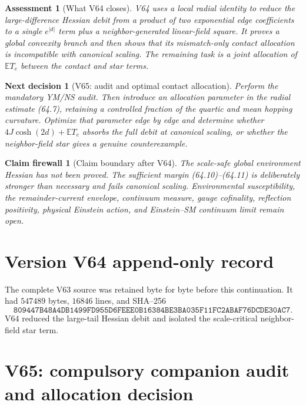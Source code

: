 \documentclass[11pt]{article}
\newtheorem{firewall}[theorem]{Claim firewall}
\newtheorem{decision}[theorem]{Next decision}
\newtheorem{assessment}[theorem]{Assessment}
\theoremstyle{remark}
\begin{document}
\begin{assessment}[What V64 closes]
\label{ass:v17v64-status}
V64 uses a local radial identity to reduce the large-difference
Hessian debit from a product of two exponential edge coefficients to
a single \(e^{|d|}\) term plus a neighbor-generated linear-field
square.  It proves a global convexity branch and then shows that its
mismatch-only contact allocation is incompatible with canonical
scaling.  The remaining task is a joint allocation of
\(\mathbb ET_e\) between the contact and star terms.
\end{assessment}

\begin{decision}[V65: audit and optimal contact allocation]
\label{dec:v17v64-next}
Perform the mandatory YM/NS audit.  Then introduce an allocation
parameter in the radial estimate (64.7), retaining a controlled
fraction of the quartic and mean hopping curvature.  Optimize that
parameter edge by edge and determine whether
\(4J\cosh(2d)+\mathbb ET_e\) absorbs the full debit at canonical
scaling, or whether the neighbor-field star gives a genuine
counterexample.
\end{decision}

\begin{firewall}[Claim boundary after V64]
\label{fire:v17v64}
The scale-safe global environment Hessian has not been proved.
The sufficient margin (64.10)--(64.11) is deliberately stronger than
necessary and fails canonical scaling.  Environmental susceptibility,
the remainder-current envelope, continuum measure, gauge cofinality,
reflection positivity, physical Einstein action, and Einstein--SM
continuum limit remain open.
\end{firewall}

\section*{Version V64 append-only record}
The complete V63 source was retained byte for byte before this
continuation.  It had \(547489\) bytes, \(16846\) lines, and SHA--256
\[
 \texttt{809447B48A4DB1499FD955D6FEEE0B16384BE3BA035F11FC2ABAF76DCDE30AC7}.
\]
V64 reduced the large-tail Hessian debit and isolated the
scale-critical neighbor-field star term.


\section{V65: compulsory companion audit and allocation decision}
\label{sec:v17v65}
\end{document}
